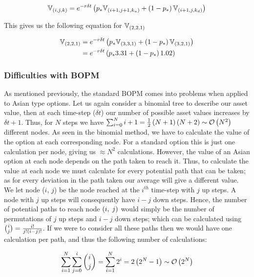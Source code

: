 \begin{equation*}
    \mathbb{V}_{\left(i,j,k\right)} = e^{-r\delta t}\left(p_*\mathbb{V}_{\left(i+1,j+1,k_u\right)} + \left(1-p_*\right)\mathbb{V}_{\left(i+1,j,k_d\right)}\right)
\end{equation*}

This gives us the following equation for \(\mathbb{V}_{\left(2,2,1\right)}\)

\begin{align*}
    \mathbb{V}_{\left(2,2,1\right)} &= e^{-r\delta t}\left(p_*\mathbb{V}_{\left(3,3,1\right)} + \left(1-p_*\right)\mathbb{V}_{\left(3,2,1\right)}\right) \\
    &= e^{-r\delta t}\left(p_*3.31 + \left(1-p_*\right)1.02\right)
\end{align*}

\subsubsection{Difficulties with BOPM}

As mentioned previously, the standard BOPM comes into problems when applied to Asian type options. Let us again consider a binomial tree to describe our asset value, then at each time-step (\(\delta t\)) our number of possible asset values increases by \(\delta t + 1\). Thus, for \(N \) steps we have \(\sum_{i=0}^N i + 1 = \frac{1}{2}\left(N+1\right)\left(N+2\right) \sim \mathcal{O}\left(N^2\right)\) different nodes. As seen in the binomial method, we have to calculate the value of the option at each corresponding node. For a standard option this is just one calculation per node, giving us \(\approx N^2\) calculations. However, the value of an Asian option at each node depends on the path taken to reach it. Thus, to calculate the value at each node we must calculate for every potential path that can be taken; as for every deviation in the path taken our average will give a different value. We let node (\(i \),\; \(j\)) be the node reached at the \(i^{th}\) time-step with \(j \) up steps. A node with \(j\) up steps will consequently have \(i-j\) down steps. Hence, the number of potential paths to reach node \(\left(i,\; j\right)\) would simply be the number of permutations of \(j \) up steps and \(i-j\) down steps; which can be calculated using \( {i\choose j} = \frac{i!}{j!\left(i-j\right)!}\). If we were to consider all these paths then we would have one calculation per path, and thus the following number of calculations:

\begin{equation*}
    \sum_{i=1}^N\sum_{j=0}^i {i \choose j} = \sum_{i=1}^N 2^i = 2\left(2^N -1\right) \sim \mathcal{O}\left(2^N\right)
\end{equation*}

